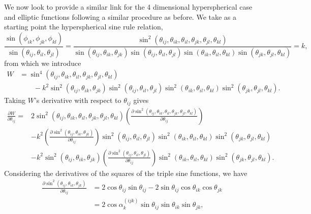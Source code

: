 \documentclass[fleqn,11pt,twoside]{article}
\theoremstyle{definition}
\begin{document}
We now look to provide a similar link for the 4 dimensional hyperspherical case and elliptic functions following a similar procedure as before. We take as a starting point the hyperspherical sine rule relation,
\begin{equation}\label{eq:hypsin} 
\frac{\sin(\phi_{ik},\phi_{jk},\phi_{kl})}{\sin(\theta_{ij},\theta_{il},\theta_{jl})}=\frac{\sin^2(\theta_{ij},\theta_{ik},\theta_{il},\theta_{jk},\theta_{jl},\theta_{kl})}{\sin(\theta_{ij},\theta_{ik},\theta_{jk})\sin(\theta_{ij},\theta_{il},\theta_{jl})\sin(\theta_{ik},\theta_{il},\theta_{kl})\sin(\theta_{jk},\theta_{jl},\theta_{kl})}=k,
\end{equation}
from which we introduce
\begin{align}
W &=\sin^4(\theta_{ij},\theta_{ik},\theta_{il},\theta_{jk},\theta_{jl},\theta_{kl}) \nonumber \\ 
& \qquad -k^2\sin^2(\theta_{ij},\theta_{ik},\theta_{jk})\sin^2(\theta_{ij},\theta_{il},\theta_{jl})\sin^2(\theta_{ik},\theta_{il},\theta_{kl})\sin^2(\theta_{jk},\theta_{jl},\theta_{kl}).
\end{align}
Taking $W$'s derivative with respect to $\theta_{ij}$ gives
\begin{equation}\label{eq:diff}
\begin{split}
\frac{\partial W}{\partial\theta_{ij}}=&2\sin^2(\theta_{ij},\theta_{ik},\theta_{il},\theta_{jk},\theta_{jl},\theta_{kl})\left(\frac{\partial\sin^2(\theta_{ij},\theta_{ik},\theta_{il},\theta_{jk},\theta_{jl},\theta_{kl})}{\partial\theta_{ij}}\right)\\
&-k^2\left(\frac{\partial\sin^2(\theta_{ij},\theta_{ik},\theta_{jk})}{\partial\theta_{ij}}\right)\sin^2(\theta_{ij},\theta_{il},\theta_{jl})\sin^2(\theta_{ik},\theta_{il},\theta_{kl})\sin^2(\theta_{jk},\theta_{jl},\theta_{kl})\\
&-k^2\sin^2(\theta_{ij},\theta_{ik},\theta_{jk})\left(\frac{\partial\sin^2(\theta_{ij},\theta_{il},\theta_{jl})}{\partial\theta_{ij}}\right)\sin^2(\theta_{ik},\theta_{il},\theta_{kl})\sin^2(\theta_{jk},\theta_{jl},\theta_{kl}).
\end{split}
\end{equation}
Considering the derivatives of the squares of the triple sine functions, we have
\begin{equation}
\begin{split}
\frac{\partial\sin^2(\theta_{ij},\theta_{ik},\theta_{jk})}{\partial\theta_{ij}}&=2\cos\theta_{ij}\sin\theta_{ij}-2\sin\theta_{ij}\cos\theta_{ik}\cos\theta_{jk}\\
&=2\cos\alpha_k^{(ijk)}\sin\theta_{ij}\sin\theta_{ik}\sin\theta_{jk},
\end{split}
\end{equation}
\end{document}
